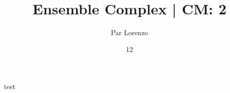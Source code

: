 \documentclass[a4paper, 12pt]{article}
\title{Ensemble Complex | CM: 2}
\author{Par Lorenzo}
\date{12}
\begin{document}
    test
\end{document}
